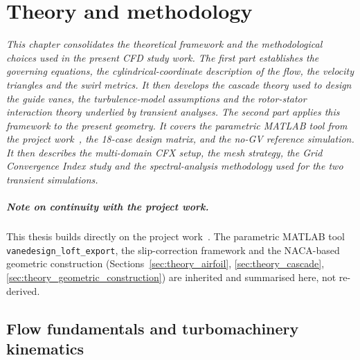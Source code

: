 \chapter{Theory and methodology}
\label{chap:theory_method}

\begin{center} %
\singlespacing\parbox{12cm}{\textit{
This chapter consolidates the theoretical framework and the methodological choices used in the present CFD study work. The first part establishes the governing equations, the cylindrical-coordinate description of the flow, the velocity triangles and the swirl metrics. It then develops the cascade theory used to design the guide vanes, the turbulence-model assumptions and the rotor-stator interaction theory underlied by transient analyses. The second part applies this framework to the present geometry. It covers the parametric MATLAB tool from the project work~\cite{Leonsen2025}, the 18-case design matrix, and the no-GV reference simulation. It then describes the multi-domain CFX setup, the mesh strategy, the Grid Convergence Index study and the spectral-analysis methodology used for the two transient simulations.
}}
\end{center}

\paragraph{Note on continuity with the project work.}
This thesis builds directly on the project work~\cite{Leonsen2025}. The parametric MATLAB tool \texttt{vanedesign\_loft\_export}, the slip-correction framework and the NACA-based geometric construction (Sections~\ref{sec:theory_airfoil}, \ref{sec:theory_cascade}, \ref{sec:theory_geometric_construction}) are inherited and summarised here, not re-derived.

\section{Flow fundamentals and turbomachinery kinematics}
\label{sec:theory_kinematics}

